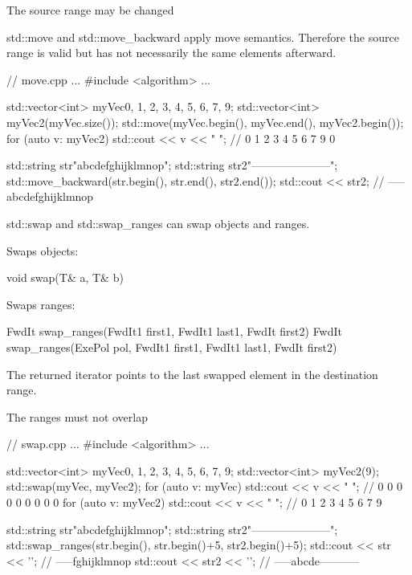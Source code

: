 \begin{myWarning}{The source range may be changed}
	
std::move and std::move\_backward apply move semantics. Therefore the source range is valid but has not necessarily the same elements afterward.
\end{myWarning}


\begin{cpp}
// move.cpp
...
#include <algorithm>
...

std::vector<int> myVec{0, 1, 2, 3, 4, 5, 6, 7, 9};
std::vector<int> myVec2(myVec.size());
std::move(myVec.begin(), myVec.end(), myVec2.begin());
for (auto v: myVec2) std::cout << v << " "; // 0 1 2 3 4 5 6 7 9 0

std::string str{"abcdefghijklmnop"};
std::string str2{"---------------------"};
std::move_backward(str.begin(), str.end(), str2.end());
std::cout << str2; // -----abcdefghijklmnop
\end{cpp}


std::swap and std::swap\_ranges can swap objects and ranges.

Swaps objects:

\begin{cpp}
void swap(T& a, T& b)
\end{cpp}

Swaps ranges:

\begin{cpp}
FwdIt swap_ranges(FwdIt1 first1, FwdIt1 last1, FwdIt first2)
FwdIt swap_ranges(ExePol pol, FwdIt1 first1, FwdIt1 last1, FwdIt first2)
\end{cpp}

The returned iterator points to the last swapped element in the destination range.

\begin{myWarning}{The ranges must not overlap}
	

\begin{cpp}
// swap.cpp
...
#include <algorithm>
...

std::vector<int> myVec{0, 1, 2, 3, 4, 5, 6, 7, 9};
std::vector<int> myVec2(9);
std::swap(myVec, myVec2);
for (auto v: myVec) std::cout << v << " "; // 0 0 0 0 0 0 0 0 0
for (auto v: myVec2) std::cout << v << " "; // 0 1 2 3 4 5 6 7 9

std::string str{"abcdefghijklmnop"};
std::string str2{"---------------------"};
std::swap_ranges(str.begin(), str.begin()+5, str2.begin()+5);
std::cout << str << '\n'; // -----fghijklmnop
std::cout << str2 << '\n'; // -----abcde-----------
\end{cpp}
\end{myWarning}


